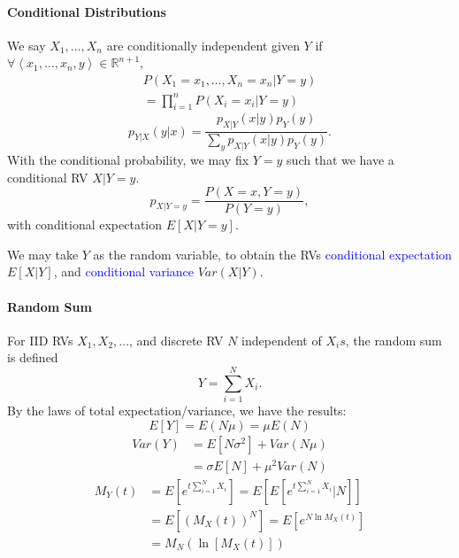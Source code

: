 \paragraph{Conditional Distributions}
We say $X_1,\ldots,X_{n}$ are conditionally independent given $Y$ if $\forall \left<x_1,\ldots,x_{n}, y\right>\in \mathbb{R}^{n+1}$,
\begin{align*}
 P\left(X_1=x_1,\ldots,X_{n}=x_{n}|Y=y\right)\\
                =\prod_{i=1}^{n} P\left( X_i=x_i|Y=y \right)
\end{align*}
\[p_{Y|X}\left(y|x\right)=\frac{p_{X|Y}\left( x|y \right) p_Y\left( y \right) }{\sum_{y} p_{X|Y}\left( x|y \right) p_Y\left( y \right)}.\] 
With the conditional probability, we may fix $Y=y$ such that we have a
\textcolor{Bittersweet}{conditional RV}
$X|Y=y$.
\[p_{X|Y=y}=\frac{P\left(X=x,Y=y\right)}{P\left(Y=y\right)},\]
with \textcolor{Bittersweet}{conditional expectation} $E \left[ X|Y=y \right]$.

We may take $Y$ as the random variable, to obtain the RVs
\textcolor{Blue}{conditional expectation} $E \left[ X|Y \right]$, and
\textcolor{Blue}{conditional variance} $Var\left( X|Y \right)$.

\paragraph{Random Sum}
For IID RVs $X_1,X_2,\ldots$, and discrete RV $N$ independent of $X_i s$, the random sum is defined
\[Y=\sum_{i=1}^{N} X_i.\]
By the laws of total expectation/variance, we have the results:
\[E \left[ Y \right]=E\left( N\mu \right) =\mu E\left( N \right) \] 
\begin{align*}
  Var(Y)&=E \left[ N\sigma^{2} \right] + Var(N\mu)\\
        &=\sigma E \left[ N \right] + \mu^{2} Var\left( N \right) 
\end{align*}
\begin{align*}
  M_Y(t)&=E \left[ e^{t \sum_{i=1}^{N} X_i} \right] = E \left[ E \left[ e^{t \sum_{i=1}^{N} X_i} | N\right] \right]\\
        &=E \left[ {\left( M_X(t) \right) }^{N} \right] = E \left[ e^{N \ln{M_X(t)}} \right]\\
        &=M_{N}\left( \ln{\left[ M_X(t) \right]} \right) 
\end{align*}
